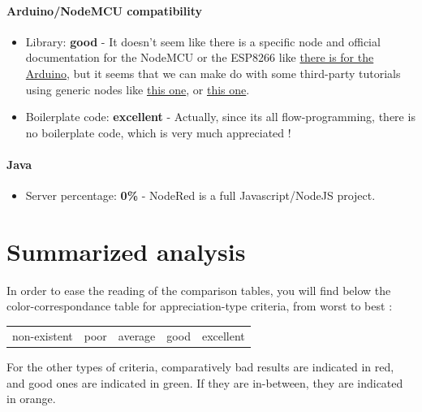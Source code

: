 \documentclass{article}
\begin{document}
\paragraph{Arduino/NodeMCU compatibility}

\begin{itemize}
\item Library: \textbf{good} - It doesn't seem like there is a specific node and official documentation for the NodeMCU or the ESP8266 like \href{https://nodered.org/docs/hardware/arduino}{there is for the Arduino}, but it seems that we can make do with some third-party tutorials using generic nodes like \href{https://www.hackster.io/itchopshop/nodemcu-with-azure-mqtt-and-node-red-ef1f94}{this one}, or \href{http://www.instructables.com/id/Tutorial-ESP8266-and-Node-RED-MQTT-GPIO-Mosquitto-/}{this one}.
\item Boilerplate code: \textbf{excellent} - Actually, since its all flow-programming, there is no boilerplate code, which is very much appreciated !
\end{itemize}

\paragraph{Java}

\begin{itemize}
\item Server percentage: \textbf{0\%} - NodeRed is a full Javascript/NodeJS project.
\end{itemize}

\newpage

\section{Summarized analysis}

In order to ease the reading of the comparison tables, you will find below the color-correspondance table for appreciation-type criteria, from worst to best :

\begin{center}
\begin{tabular}{r|r|r|r|r}
\cellcolor{red!25}non-existent & \cellcolor{orange!25}poor & \cellcolor{yellow!25}average & \cellcolor{blue!10}good & \cellcolor{green!25}excellent \\
\end{tabular}
\end{center}

For the other types of criteria, comparatively bad results are indicated in red, and good ones are indicated in green. If they are in-between, they are indicated in orange.
\end{document}
